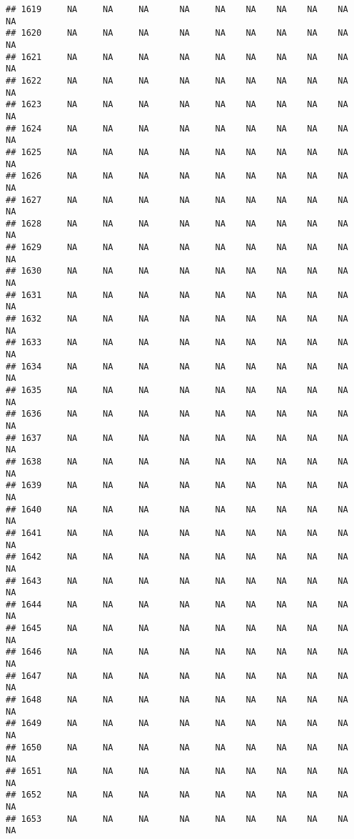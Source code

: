 \documentclass{article}\usepackage{graphicx, color}
\makeatletter
\newenvironment{kframe}{%
 \def\at@end@of@kframe{}%
 \ifinner\ifhmode%
  \def\at@end@of@kframe{\end{minipage}}%
  \begin{minipage}{\columnwidth}%
 \fi\fi%
 \def\FrameCommand##1{\hskip\@totalleftmargin \hskip-\fboxsep
 \colorbox{shadecolor}{##1}\hskip-\fboxsep
     \hskip-\linewidth \hskip-\@totalleftmargin \hskip\columnwidth}%
 \MakeFramed {\advance\hsize-\width
   \@totalleftmargin\z@ \linewidth\hsize
   \@setminipage}}%
 {\par\unskip\endMakeFramed%
 \at@end@of@kframe}
\newenvironment{knitrout}{}{} %
\makeatother
\begin{document}
\begin{knitrout}
\begin{kframe}
\begin{verbatim}
## 1619     NA     NA     NA      NA     NA    NA    NA    NA    NA     NA
## 1620     NA     NA     NA      NA     NA    NA    NA    NA    NA     NA
## 1621     NA     NA     NA      NA     NA    NA    NA    NA    NA     NA
## 1622     NA     NA     NA      NA     NA    NA    NA    NA    NA     NA
## 1623     NA     NA     NA      NA     NA    NA    NA    NA    NA     NA
## 1624     NA     NA     NA      NA     NA    NA    NA    NA    NA     NA
## 1625     NA     NA     NA      NA     NA    NA    NA    NA    NA     NA
## 1626     NA     NA     NA      NA     NA    NA    NA    NA    NA     NA
## 1627     NA     NA     NA      NA     NA    NA    NA    NA    NA     NA
## 1628     NA     NA     NA      NA     NA    NA    NA    NA    NA     NA
## 1629     NA     NA     NA      NA     NA    NA    NA    NA    NA     NA
## 1630     NA     NA     NA      NA     NA    NA    NA    NA    NA     NA
## 1631     NA     NA     NA      NA     NA    NA    NA    NA    NA     NA
## 1632     NA     NA     NA      NA     NA    NA    NA    NA    NA     NA
## 1633     NA     NA     NA      NA     NA    NA    NA    NA    NA     NA
## 1634     NA     NA     NA      NA     NA    NA    NA    NA    NA     NA
## 1635     NA     NA     NA      NA     NA    NA    NA    NA    NA     NA
## 1636     NA     NA     NA      NA     NA    NA    NA    NA    NA     NA
## 1637     NA     NA     NA      NA     NA    NA    NA    NA    NA     NA
## 1638     NA     NA     NA      NA     NA    NA    NA    NA    NA     NA
## 1639     NA     NA     NA      NA     NA    NA    NA    NA    NA     NA
## 1640     NA     NA     NA      NA     NA    NA    NA    NA    NA     NA
## 1641     NA     NA     NA      NA     NA    NA    NA    NA    NA     NA
## 1642     NA     NA     NA      NA     NA    NA    NA    NA    NA     NA
## 1643     NA     NA     NA      NA     NA    NA    NA    NA    NA     NA
## 1644     NA     NA     NA      NA     NA    NA    NA    NA    NA     NA
## 1645     NA     NA     NA      NA     NA    NA    NA    NA    NA     NA
## 1646     NA     NA     NA      NA     NA    NA    NA    NA    NA     NA
## 1647     NA     NA     NA      NA     NA    NA    NA    NA    NA     NA
## 1648     NA     NA     NA      NA     NA    NA    NA    NA    NA     NA
## 1649     NA     NA     NA      NA     NA    NA    NA    NA    NA     NA
## 1650     NA     NA     NA      NA     NA    NA    NA    NA    NA     NA
## 1651     NA     NA     NA      NA     NA    NA    NA    NA    NA     NA
## 1652     NA     NA     NA      NA     NA    NA    NA    NA    NA     NA
## 1653     NA     NA     NA      NA     NA    NA    NA    NA    NA     NA

\end{verbatim}
\end{kframe}
\end{knitrout}
\end{document}
